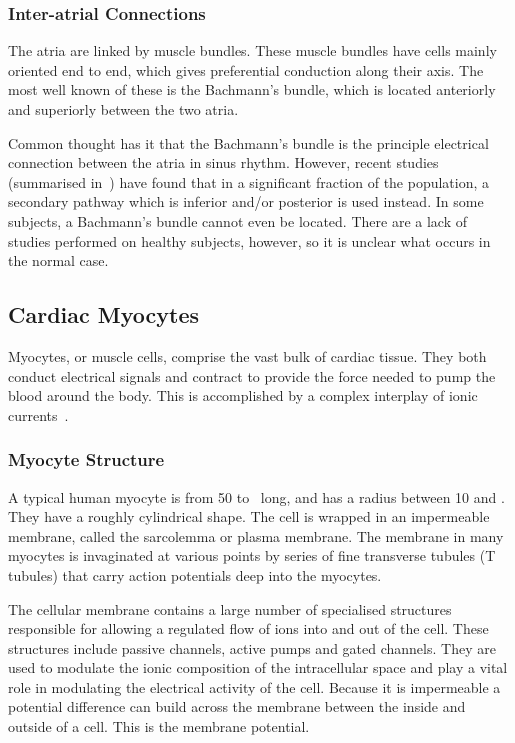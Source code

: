 \subsubsection{Inter-atrial Connections}

The atria are linked by muscle bundles.
These muscle bundles have cells mainly oriented end to end, which gives
preferential conduction along their axis.
The most well known of these is the Bachmann's bundle, which is located
anteriorly and superiorly between the two atria.

Common thought has it that the Bachmann's bundle is the principle electrical
connection between the atria in sinus rhythm.
However, recent studies (summarised in~\cite{Platonov2007,Platonov2008a}) have
found that in a significant fraction of the population, a secondary pathway
which is inferior and/or posterior is used instead.
In some subjects, a Bachmann's bundle cannot even be located.
There are a lack of studies performed on healthy subjects, however, so it is
unclear what occurs in the normal case.

\subsection{Cardiac Myocytes}

Myocytes, or muscle cells, comprise the vast bulk of cardiac tissue.
They both conduct electrical signals and contract to provide the force needed to
pump the blood around the body.
This is accomplished by a complex interplay of ionic
currents~\cite{Katz2006}.

\subsubsection{Myocyte Structure}

A typical human myocyte is from 50 to \ long, and has a radius
between 10 and .
They have a roughly cylindrical shape.
The cell is wrapped in an impermeable membrane, called the sarcolemma or plasma
membrane.
The membrane in many myocytes is invaginated at various points by series of
fine transverse tubules (T tubules) that carry action potentials deep into the
myocytes.

The cellular membrane contains a large number of specialised structures
responsible for allowing a regulated flow of ions into and out of the cell.
These structures include passive channels, active pumps and gated channels.
They are used to modulate the ionic composition of the intracellular
space and play a vital role in modulating the electrical activity of the cell.
Because it is impermeable a potential difference can build across the membrane
between the inside and outside of a cell.
This is the membrane potential.

